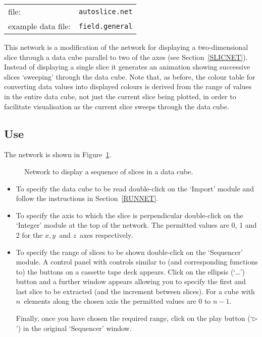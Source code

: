 \documentclass[twoside,11pt]{article}
\begin{document}
\begin{tabular}{ll}
file:              & {\tt autoslice.net} \\
example data file: & {\tt field.general} \\
\end{tabular}

This network is a modification of the network for displaying a
two-dimensional slice through a data cube parallel to two of the axes
(see Section~\ref{SLICNET}). Instead of displaying a single slice it
generates an animation showing successive slices `sweeping' through the
data cube. Note that, as before, the colour table for converting data
values into displayed colours is derived from the range of values in the
entire data cube, not just the current slice being plotted, in order to
facilitate visualisation as the current slice sweeps through the data
cube.

\subsection{Use}

The network is shown in Figure~\ref{ASLICNETF}.

\begin{figure}[htbp]

\begin{center}
\leavevmode
\epsfxsize=553pt
\end{center}

\caption[Network to display a sequence of slices in a data cube.]{Network
to display a sequence of slices in a data cube. \label{ASLICNETF} }

\end{figure}

\begin{itemize}

  \item To specify the data cube to be read double-click on the `Import'
   module and follow the instructions in Section~\ref{RUNNET}.

  \item To specify the axis to which the slice is perpendicular
   double-click on the `Integer' module at the top of the network. The
   permitted values are 0, 1 and 2 for the $x, y$\, and $z$\, axes
   respectively.

  \item To specify the range of slices to be shown double-click on the
   `Sequencer' module. A control panel with controls similar to (and
   corresponding functions to) the buttons on a cassette tape deck
   appears. Click on the ellipsis (`\ldots') button and a further window
   appears allowing you to specify the first and last slice to be
   extracted (and the increment between slices). For a cube with $n$\,
   elements along the chosen axis the permitted values are 0 to $n-1$.

   Finally, once you have chosen the required range, click on the play
   button (`$\triangleright$') in the original `Sequencer' window.

\end{itemize}
\end{document}

